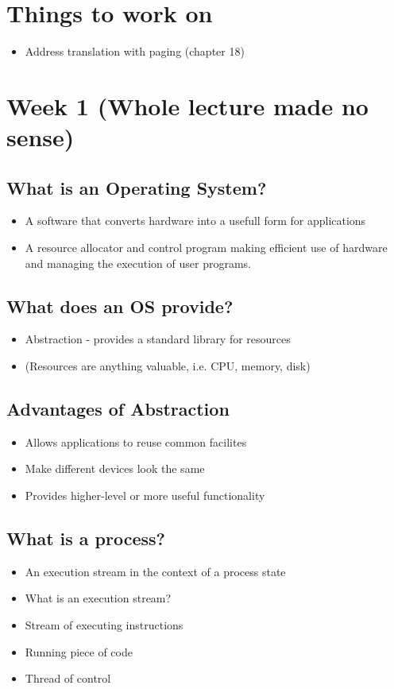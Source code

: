 \documentclass[12pt, letterpaper]{article}
\begin{document}
\section*{Things to work on}
\begin{itemize}
    \item Address translation with paging (chapter 18)
\end{itemize}

\section*{Week 1 (Whole lecture made no sense)}
\subsection*{What is an Operating System?}
\begin{itemize}
    \item A software that converts hardware into a usefull form for applications 
    \item A resource allocator and control program making efficient use 
    of hardware and managing the execution of user programs. 
\end{itemize}
\subsection*{What does an OS provide?}
\begin{itemize}
    \item Abstraction - provides a standard library for resources
    \item (Resources are anything valuable, i.e. CPU, memory, disk)
\end{itemize}
\subsection*{Advantages of Abstraction}
\begin{itemize}
    \item Allows applications to reuse common facilites 
    \item Make different devices look the same 
    \item Provides higher-level or more useful functionality 
\end{itemize}
\subsection*{What is a process?}
\begin{itemize}
    \item An execution stream in the context of a process state 
    \item What is an execution stream?
    \item Stream of executing instructions 
    \item Running piece of code 
    \item Thread of control 
\end{itemize}
\end{document}
